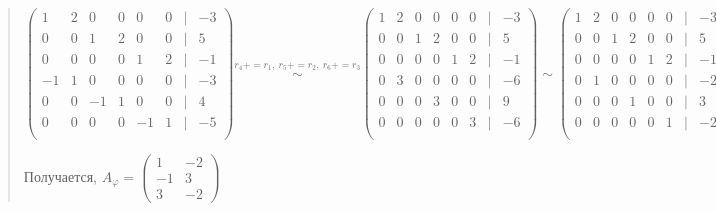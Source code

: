 \documentclass{article}
\begin{document}
\begin{quote}
$
\begin{pmatrix}
1 & 2 & 0 & 0 & 0 & 0 & | & -3 \\    
0 & 0 & 1 & 2 & 0 & 0 & | & 5 \\    
0 & 0 & 0 & 0 & 1 & 2 & | & -1 \\    
-1 & 1 & 0 & 0 & 0 & 0 & | & -3 \\    
0 & 0 & -1 & 1 & 0 & 0 & | & 4 \\    
0 & 0 & 0 & 0 & -1 & 1 & | & -5 \\    
\end{pmatrix} \overset{r_4 += r_1, \ r_5 += r_2, \ r_6 += r_3}{\sim}
\begin{pmatrix}
1 & 2 & 0 & 0 & 0 & 0 & | & -3 \\    
0 & 0 & 1 & 2 & 0 & 0 & | & 5 \\    
0 & 0 & 0 & 0 & 1 & 2 & | & -1 \\    
0 & 3 & 0 & 0 & 0 & 0 & | & -6 \\    
0 & 0 & 0 & 3 & 0 & 0 & | & 9 \\    
0 & 0 & 0 & 0 & 0 & 3 & | & -6 \\    
\end{pmatrix} \sim
\begin{pmatrix}
1 & 2 & 0 & 0 & 0 & 0 & | & -3 \\    
0 & 0 & 1 & 2 & 0 & 0 & | & 5 \\    
0 & 0 & 0 & 0 & 1 & 2 & | & -1 \\    
0 & 1 & 0 & 0 & 0 & 0 & | & -2 \\    
0 & 0 & 0 & 1 & 0 & 0 & | & 3 \\    
0 & 0 & 0 & 0 & 0 & 1 & | & -2 \\    
\end{pmatrix} \overset{r_1 += -2r_4, \ r_2 += -2r_5, \ r_3 += -2r_6}{\sim}
\begin{pmatrix}
1 & 0 & 0 & 0 & 0 & 0 & | & 1 \\    
0 & 0 & 1 & 0 & 0 & 0 & | & -1 \\    
0 & 0 & 0 & 0 & 1 & 0 & | & 3 \\    
0 & 1 & 0 & 0 & 0 & 0 & | & -2 \\    
0 & 0 & 0 & 1 & 0 & 0 & | & 3 \\    
0 & 0 & 0 & 0 & 0 & 1 & | & -2 \\    
\end{pmatrix}
$

Получается, 
$A_{\varphi} = \begin{pmatrix}
   1 & - 2 \\ -1 & 3 \\ 3 & - 2 
\end{pmatrix}$


\end{quote}
\end{document}
